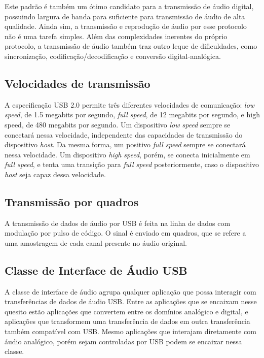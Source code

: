 Este padrão é também um ótimo candidato para a transmissão de áudio digital, possuindo largura de banda para suficiente para transmissão de áudio de alta qualidade.
Ainda sim, a transmissão e reprodução de áudio por esse protocolo não é uma tarefa simples. Além das complexidades inerentes do próprio protocolo, a transmissão de áudio também traz outro leque de dificuldades, como sincronização, codificação/decodificação e conversão digital-analógica. 

\subsection{Velocidades de transmissão}
A especificação USB 2.0 permite três diferentes velocidades de comunicação: \textit{low speed}, de 1.5 megabits por segundo, \textit{full speed}, de 12 megabits por segundo, e high speed, de 480 megabits por segundo. Um dispositivo \textit{low speed} sempre se conectará  nessa velocidade, independente das capacidades de transmissão do dispositivo \textit{host}. Da mesma forma, um positivo \textit{full speed} sempre se conectará nessa velocidade. Um dispositivo \textit{high speed}, porém, se conecta inicialmente em \textit{full speed}, e tenta uma transição para \textit{full speed} posteriormente, caso o dispositivo \textit{host} seja capaz dessa velocidade.

\subsection{Transmissão por quadros}
A transmissão de dados de áudio por USB é feita na linha de dados com modulação por pulso de código. O sinal é enviado em quadros, que se refere a uma amostragem de cada canal presente no áudio original.


\subsection{Classe de Interface de Áudio USB}

A classe de interface de áudio agrupa qualquer aplicação que possa interagir com transferências de dados de áudio USB.
Entre as aplicações que se encaixam nesse quesito estão aplicações que convertem entre os domínios analógico e digital, e aplicações que transformem uma transferência de dados em outra transferência também compatível com USB. Mesmo aplicações que interajam diretamente com áudio analógico, porém sejam controladas por USB podem se encaixar nessa classe.

